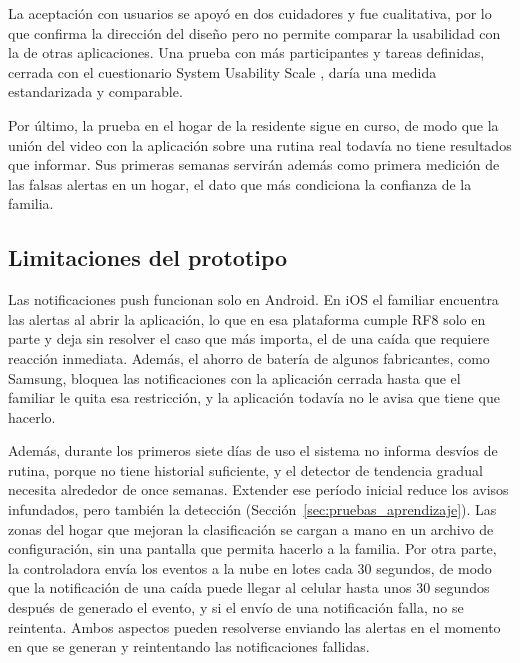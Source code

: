La aceptación con usuarios se apoyó en dos cuidadores y fue cualitativa, por lo que confirma la dirección del diseño pero no permite comparar la usabilidad con la de otras aplicaciones.
Una prueba con más participantes y tareas definidas, cerrada con el cuestionario System Usability Scale \parencite{Brooke1996}, daría una medida estandarizada y comparable.

Por último, la prueba en el hogar de la residente sigue en curso, de modo que la unión del video con la aplicación sobre una rutina real todavía no tiene resultados que informar.
Sus primeras semanas servirán además como primera medición de las falsas alertas en un hogar, el dato que más condiciona la confianza de la familia.

\subsection{Limitaciones del prototipo}

Las notificaciones push funcionan solo en Android.
En iOS el familiar encuentra las alertas al abrir la aplicación, lo que en esa plataforma cumple RF8 solo en parte y deja sin resolver el caso que más importa, el de una caída que requiere reacción inmediata.
Además, el ahorro de batería de algunos fabricantes, como Samsung, bloquea las notificaciones con la aplicación cerrada hasta que el familiar le quita esa restricción, y la aplicación todavía no le avisa que tiene que hacerlo.

Además, durante los primeros siete días de uso el sistema no informa desvíos de rutina, porque no tiene historial suficiente, y el detector de tendencia gradual necesita alrededor de once semanas.
Extender ese período inicial reduce los avisos infundados, pero también la detección (Sección~\ref{sec:pruebas_aprendizaje}).
Las zonas del hogar que mejoran la clasificación se cargan a mano en un archivo de configuración, sin una pantalla que permita hacerlo a la familia.
Por otra parte, la controladora envía los eventos a la nube en lotes cada 30 segundos, de modo que la notificación de una caída puede llegar al celular hasta unos 30 segundos después de generado el evento, y si el envío de una notificación falla, no se reintenta.
Ambos aspectos pueden resolverse enviando las alertas en el momento en que se generan y reintentando las notificaciones fallidas.

